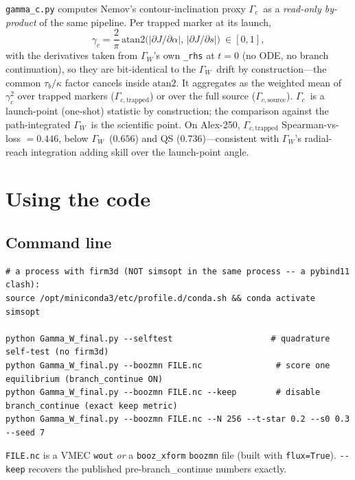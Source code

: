 \documentclass[11pt]{article}
\newcommand{\code}[1]{\texttt{#1}}
\newcommand{\GW}{\ensuremath{\Gamma_W}}
\newcommand{\Gc}{\ensuremath{\Gamma_c}}
\begin{document}
\code{gamma\_c.py} computes Nemov's contour-inclination proxy \Gc\ as a \emph{read-only
by-product} of the same pipeline. Per trapped marker at its launch,
\begin{equation}
  \gamma_c = \frac{2}{\pi}\,\mathrm{atan2}\!\big(|\partial J/\partial\alpha|,\,
             |\partial J/\partial s|\big)\ \in[0,1],
\end{equation}
with the derivatives taken from \GW's own \code{\_rhs} at $t=0$ (no ODE, no branch continuation),
so they are bit-identical to the \GW\ drift by construction---the common $\tau_b/\kappa$ factor
cancels inside $\mathrm{atan2}$. It aggregates as the weighted mean of $\gamma_c^2$ over trapped
markers ($\Gamma_{c,\mathrm{trapped}}$) or over the full source ($\Gamma_{c,\mathrm{source}}$). \Gc\ is a launch-point
(one-shot) statistic by construction; the comparison against the path-integrated \GW\ is the
scientific point. On Alex-250, $\Gamma_{c,\mathrm{trapped}}$ Spearman-vs-loss $=0.446$, below \GW\ ($0.656$)
and QS ($0.736$)---consistent with \GW's radial-reach integration adding skill over the
launch-point angle.

\section{Using the code}

\subsection{Command line}
\begin{Verbatim}[fontsize=\small,frame=single,rulecolor=\color{gray}]
# a process with firm3d (NOT simsopt in the same process -- a pybind11 clash):
source /opt/miniconda3/etc/profile.d/conda.sh && conda activate simsopt

python Gamma_W_final.py --selftest                    # quadrature self-test (no firm3d)
python Gamma_W_final.py --boozmn FILE.nc               # score one equilibrium (branch_continue ON)
python Gamma_W_final.py --boozmn FILE.nc --keep        # disable branch_continue (exact keep metric)
python Gamma_W_final.py --boozmn FILE.nc --N 256 --t-star 0.2 --s0 0.3 --seed 7
\end{Verbatim}
\code{FILE.nc} is a VMEC \code{wout} \emph{or} a \code{booz\_xform} \code{boozmn} file (built with
\code{flux=True}). \code{-{}-keep} recovers the published pre-branch\_continue numbers exactly.
\end{document}
